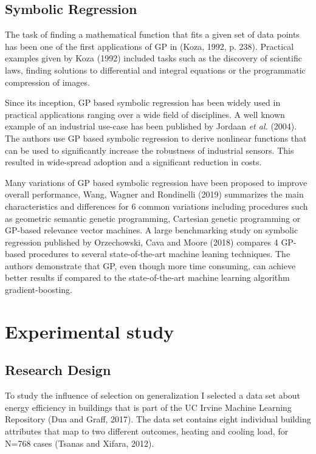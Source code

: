 \documentclass[
  12pt,
]{article}
\begin{document}
\hypertarget{symbolic-regression}{%
\subsection{Symbolic Regression}\label{symbolic-regression}}

The task of finding a mathematical function that fits a given set of
data points has been one of the first applications of GP in (Koza, 1992,
p. 238). Practical examples given by Koza (1992) included tasks such as
the discovery of scientific laws, finding solutions to differential and
integral equations or the programmatic compression of images.

Since its inception, GP based symbolic regression has been widely used
in practical applications ranging over a wide field of disciplines. A
well known example of an industrial use-case has been published by
Jordaan \emph{et al.} (2004). The authors use GP based symbolic
regression to derive nonlinear functions that can be used to
significantly increase the robustness of industrial sensors. This
resulted in wide-spread adoption and a significant reduction in costs.

Many variations of GP based symbolic regression have been proposed to
improve overall performance, Wang, Wagner and Rondinelli (2019)
summarizes the main characteristics and differences for 6 common
variations including procedures such as geometric semantic genetic
programming, Cartesian genetic programming or GP-based relevance vector
machines. A large benchmarking study on symbolic regression published by
Orzechowski, Cava and Moore (2018) compares 4 GP-based procedures to
several state-of-the-art machine leaning techniques. The authors
demonstrate that GP, even though more time consuming, can achieve better
results if compared to the state-of-the-art machine learning algorithm
gradient-boosting.

\hypertarget{experimental-study}{%
\section{Experimental study}\label{experimental-study}}

\hypertarget{research-design}{%
\subsection{Research Design}\label{research-design}}

To study the influence of selection on generalization I selected a data
set about energy efficiency in buildings that is part of the UC Irvine
Machine Learning Repository (Dua and Graff, 2017). The data set contains
eight individual building attributes that map to two different outcomes,
heating and cooling load, for N=768 cases (Tsanas and Xifara, 2012).
\end{document}
